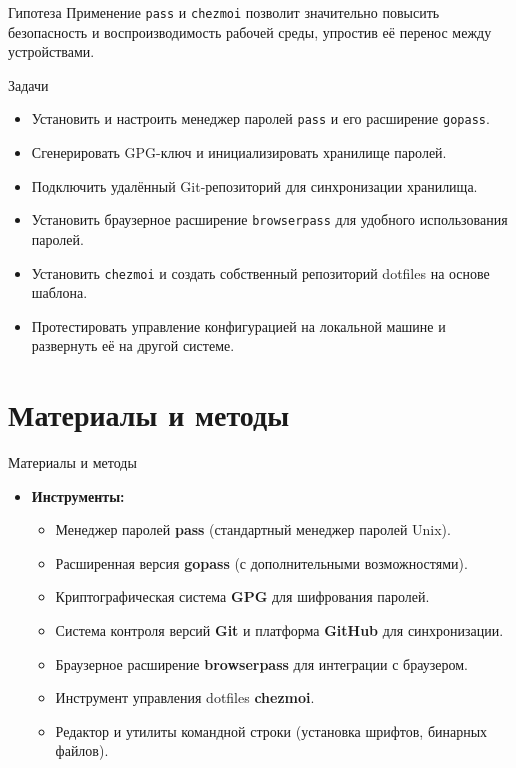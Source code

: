 \documentclass[
  ignorenonframetext,
  aspectratio=169,
  russian,
  aspectratio=169]{beamer}
\providecommand{\tightlist}{%
  \setlength{\itemsep}{0pt}\setlength{\parskip}{0pt}}
\begin{document}
\begin{frame}[fragile]{Гипотеза}
\protect{}\label{ux433ux438ux43fux43eux442ux435ux437ux430}
Применение \texttt{pass} и \texttt{chezmoi} позволит значительно
повысить безопасность и воспроизводимость рабочей среды, упростив её
перенос между устройствами.
\end{frame}

\begin{frame}[fragile]{Задачи}
\protect{}\label{ux437ux430ux434ux430ux447ux438}
\begin{itemize}[<+->]
\tightlist
\item
  Установить и настроить менеджер паролей \texttt{pass} и его расширение
  \texttt{gopass}.
\item
  Сгенерировать GPG-ключ и инициализировать хранилище паролей.
\item
  Подключить удалённый Git-репозиторий для синхронизации хранилища.
\item
  Установить браузерное расширение \texttt{browserpass} для удобного
  использования паролей.
\item
  Установить \texttt{chezmoi} и создать собственный репозиторий dotfiles
  на основе шаблона.
\item
  Протестировать управление конфигурацией на локальной машине и
  развернуть её на другой системе.
\end{itemize}
\end{frame}

\section{Материалы и
методы}\label{ux43cux430ux442ux435ux440ux438ux430ux43bux44b-ux438-ux43cux435ux442ux43eux434ux44b}

\begin{frame}{Материалы и методы}
\protect{}\label{ux43cux430ux442ux435ux440ux438ux430ux43bux44b-ux438-ux43cux435ux442ux43eux434ux44b-1}
\begin{itemize}[<+->]
\tightlist
\item
  \textbf{Инструменты:}

  \begin{itemize}[<+->]
  \tightlist
  \item
    Менеджер паролей \textbf{pass} (стандартный менеджер паролей Unix).
  \item
    Расширенная версия \textbf{gopass} (с дополнительными
    возможностями).
  \item
    Криптографическая система \textbf{GPG} для шифрования паролей.
  \item
    Система контроля версий \textbf{Git} и платформа \textbf{GitHub} для
    синхронизации.
  \item
    Браузерное расширение \textbf{browserpass} для интеграции с
    браузером.
  \item
    Инструмент управления dotfiles \textbf{chezmoi}.
  \item
    Редактор и утилиты командной строки (установка шрифтов, бинарных
    файлов).
  \end{itemize}
\end{itemize}
\end{frame}
\end{document}
